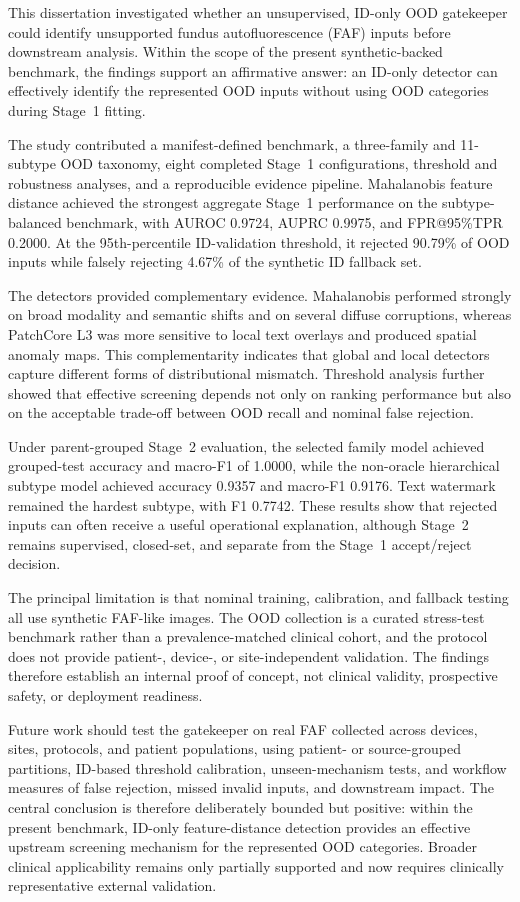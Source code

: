 \documentclass[fleqn,12pt]{olplainarticle}
\begin{document}
This dissertation investigated whether an unsupervised, ID-only OOD
gatekeeper could identify unsupported fundus autofluorescence (FAF) inputs
before downstream analysis. Within the scope of the present synthetic-backed
benchmark, the findings support an affirmative answer: an ID-only detector can
effectively identify the represented OOD inputs without using OOD categories
during Stage~1 fitting.

The study contributed a manifest-defined benchmark, a three-family and
11-subtype OOD taxonomy, eight completed Stage~1 configurations, threshold and
robustness analyses, and a reproducible evidence pipeline. Mahalanobis feature
distance achieved the strongest aggregate Stage~1 performance on the
subtype-balanced benchmark, with AUROC 0.9724, AUPRC 0.9975, and
FPR@95\%TPR 0.2000. At the 95th-percentile ID-validation threshold, it rejected
90.79\% of OOD inputs while falsely rejecting 4.67\% of the synthetic ID
fallback set.

The detectors provided complementary evidence. Mahalanobis performed strongly
on broad modality and semantic shifts and on several diffuse corruptions,
whereas PatchCore L3 was more sensitive to local text overlays and produced
spatial anomaly maps. This complementarity indicates that global and local
detectors capture different forms of distributional mismatch. Threshold
analysis further showed that effective screening depends not only on ranking
performance but also on the acceptable trade-off between OOD recall and
nominal false rejection.

Under parent-grouped Stage~2 evaluation, the selected family model achieved
grouped-test accuracy and macro-F1 of 1.0000, while the non-oracle
hierarchical subtype model achieved accuracy 0.9357 and macro-F1 0.9176. Text
watermark remained the hardest subtype, with F1 0.7742. These results show that
rejected inputs can often receive a useful operational explanation, although
Stage~2 remains supervised, closed-set, and separate from the Stage~1
accept/reject decision.

The principal limitation is that nominal training, calibration, and fallback
testing all use synthetic FAF-like images. The OOD collection is a curated
stress-test benchmark rather than a prevalence-matched clinical cohort, and
the protocol does not provide patient-, device-, or site-independent
validation. The findings therefore establish an internal proof of concept,
not clinical validity, prospective safety, or deployment readiness.

Future work should test the gatekeeper on real FAF collected across devices,
sites, protocols, and patient populations, using patient- or source-grouped
partitions, ID-based threshold calibration, unseen-mechanism tests, and
workflow measures of false rejection, missed invalid inputs, and downstream
impact. The central conclusion is therefore deliberately bounded but positive:
within the present benchmark, ID-only feature-distance detection provides an
effective upstream screening mechanism for the represented OOD categories.
Broader clinical applicability remains only partially supported and now
requires clinically representative external validation.
\end{document}
